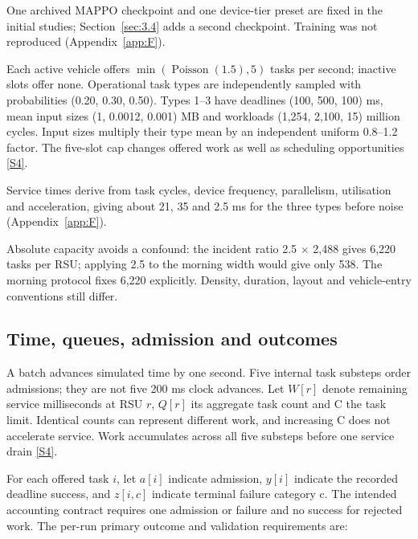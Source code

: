 \documentclass[12pt,a4paper]{article}
\begin{document}
One archived MAPPO checkpoint and one device-tier preset are fixed in the initial studies; Section~\ref{sec:3.4} adds a second checkpoint. Training was not reproduced (Appendix~\ref{app:F}).

Each active vehicle offers $\min(\operatorname{Poisson}(1.5),5)$ tasks per second; inactive slots offer none. Operational task types are independently sampled with probabilities (0.20, 0.30, 0.50). Types 1--3 have deadlines (100, 500, 100) ms, mean input sizes (1, 0.0012, 0.001) MB and workloads (1,254, 2,100, 15) million cycles. Input sizes multiply their type mean by an independent uniform 0.8--1.2 factor. The five-slot cap changes offered work as well as scheduling opportunities \hyperref[source-s4]{[S4]}.

Service times derive from task cycles, device frequency, parallelism, utilisation and acceleration, giving about 21, 35 and 2.5 ms for the three types before noise (Appendix~\ref{app:F}).

Absolute capacity avoids a confound: the incident ratio 2.5 \ensuremath{\times} 2,488 gives 6,220 tasks per RSU; applying 2.5 to the morning width would give only 538. The morning protocol fixes 6,220 explicitly. Density, duration, layout and vehicle-entry conventions still differ.

\FloatBarrier
\subsection{Time, queues, admission and outcomes}\label{sec:2.4}

A batch advances simulated time by one second. Five internal task substeps order admissions; they are not five 200 ms clock advances. Let $W[r]$ denote remaining service milliseconds at RSU $r$, $Q[r]$ its aggregate task count and C the task limit. Identical counts can represent different work, and increasing C does not accelerate service. Work accumulates across all five substeps before one service drain \hyperref[source-s4]{[S4]}.

For each offered task $i$, let $a[i]$ indicate admission, $y[i]$ indicate the recorded deadline success, and $z[i,c]$ indicate terminal failure category c. The intended accounting contract requires one admission or failure and no success for rejected work. The per-run primary outcome and validation requirements are:
\end{document}
